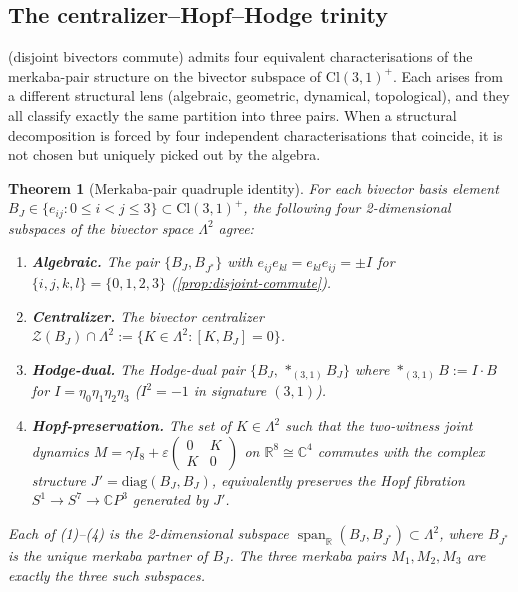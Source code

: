 \documentclass[11pt,a4paper]{article}
\theoremstyle{plain}
\newtheorem{theorem}{Theorem}[section]
\theoremstyle{definition}
\theoremstyle{remark}
\numberwithin{equation}{section}
\providecommand{\Cl}{\mathrm{Cl}}
\providecommand{\R}{\mathbb{R}}
\providecommand{\C}{\mathbb{C}}
\providecommand{\eb}[1]{e_{#1}}
\DeclareMathOperator{\spn}{span}
\begin{document}
\subsection{The centralizer--Hopf--Hodge trinity}
\label{sec:centralizer-trinity}

 (disjoint bivectors commute) admits
four equivalent characterisations of the merkaba-pair structure on
the bivector subspace of $\Cl(3,1)^+$.  Each arises from a
different structural lens (algebraic, geometric, dynamical,
topological), and they all classify exactly the same partition
into three pairs.  When a structural decomposition is forced by
four independent characterisations that coincide, it is not chosen
but uniquely picked out by the algebra.

\begin{theorem}[Merkaba-pair quadruple identity]
\label{thm:merkaba-quadruple}
For each bivector basis element
$B_J \in \{\eb{ij} : 0 \le i < j \le 3\} \subset \Cl(3,1)^+$, the
following four 2-dimensional subspaces of the bivector space
$\Lambda^2$ agree:
\begin{enumerate}
  \item \textbf{Algebraic.}  The pair $\{B_J, B_{J^*}\}$ with
    $\eb{ij}\eb{kl} = \eb{kl}\eb{ij} = \pm I$ for
    $\{i,j,k,l\} = \{0,1,2,3\}$
    (\cref{prop:disjoint-commute}).
  \item \textbf{Centralizer.}  The bivector centralizer
    $\mathcal{Z}(B_J) \cap \Lambda^2 := \{K \in \Lambda^2 :
    [K, B_J] = 0\}$.
  \item \textbf{Hodge-dual.}  The Hodge-dual pair
    $\{B_J,\, *_{(3,1)} B_J\}$ where
    $*_{(3,1)} B := I \cdot B$ for
    $I = \eta_0 \eta_1 \eta_2 \eta_3$ ($I^2 = -1$ in signature
    $(3,1)$).
  \item \textbf{Hopf-preservation.}  The set of $K \in \Lambda^2$
    such that the two-witness joint dynamics
    $M = \gamma I_8 + \varepsilon \begin{pmatrix} 0 & K \\ K & 0
    \end{pmatrix}$ on $\R^8 \cong \C^4$ commutes with the complex
    structure $J' = \mathrm{diag}(B_J, B_J)$, equivalently
    preserves the Hopf fibration
    $S^1 \to S^7 \to \C P^3$ generated by $J'$.
\end{enumerate}
Each of \textup{(1)}--\textup{(4)} is the 2-dimensional subspace
$\spn_\R(B_J, B_{J^*}) \subset \Lambda^2$, where $B_{J^*}$ is the
unique merkaba partner of $B_J$.  The three merkaba pairs $M_1,
M_2, M_3$ are exactly the three such subspaces.
\end{theorem}
\end{document}
